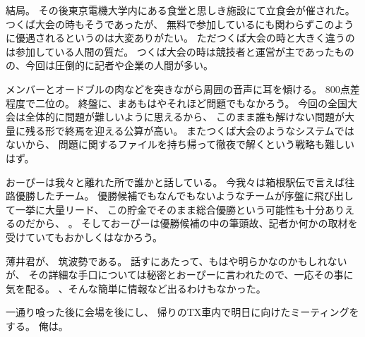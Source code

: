 結局。
その後東京電機大学内にある食堂と思しき施設にて立食会が催された。
つくば大会の時もそうであったが、
無料で参加しているにも関わらずこのように優遇されるというのは大変ありがたい。
ただつくば大会の時と大きく違うのは参加している人間の質だ。
つくば大会の時は競技者と運営が主であったものの、今回は圧倒的に記者や企業の人間が多い。

メンバーとオードブルの肉などを突きながら周囲の音声に耳を傾ける。
800点差程度で二位の。
終盤に、まあもはやそれほど問題でもなかろう。
今回の全国大会は全体的に問題が難しいように思えるから、
このまま誰も解けない問題が大量に残る形で終焉を迎える公算が高い。
またつくば大会のようなシステムではないから、
問題に関するファイルを持ち帰って徹夜で解くという戦略も難しいはず。

おーぴーは我々と離れた所で誰かと話している。
今我々は箱根駅伝で言えば往路優勝したチーム。
優勝候補でもなんでもないようなチームが序盤に飛び出して一挙に大量リード、
この貯金でそのまま総合優勝という可能性も十分ありえるのだから、
。
そしておーぴーは優勝候補の中の筆頭故、記者か何かの取材を受けていてもおかしくはなかろう。

薄井君が、
筑波勢である。%
話すにあたって、もはや明らかなのかもしれないが、
その詳細な手口については秘密とおーぴーに言われたので、一応その事に気を配る。
、そんな簡単に情報など出るわけもなかった。

一通り喰った後に会場を後にし、
帰りのTX車内で明日に向けたミーティングをする。
俺は。
